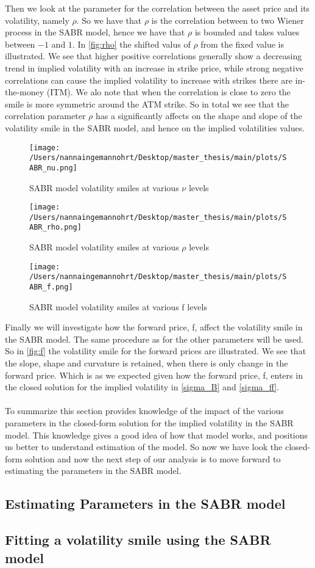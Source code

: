 Then we look at the parameter for the correlation between the asset price and its volatility, namely $\rho$.
So we have that $\rho$ is the correlation between to two Wiener process in the SABR model, hence we have
that $\rho$ is bounded and takes values between $-1$ and $1$. In \autoref{fig:rho} the shifted valus of $\rho$
from the fixed value is illustrated. 
We see that higher positive correlations generally show a decreasing trend in implied volatility with an increase in strike price, 
while strong negative correlations can cause the implied volatility to increase with strikes there are in-the-money (ITM).
We alo note that when the correlation is close to zero the smile is more symmetric around the ATM strike. 
So in total we see that the correlation parameter $\rho$ has a significantly affects on the shape and slope of
the volatility smile in the SABR model, and hence on the implied volatilities values.
\begin{figure}[H]
    \centering
    \texttt{[image: /Users/nannaingemannohrt/Desktop/master\_thesis/main/plots/SABR\_nu.png]}
    \caption{SABR model volatility smiles at various $\nu$ levels}
    \label{fig:nu}
\end{figure}

\begin{figure}[H]
    \centering
    \texttt{[image: /Users/nannaingemannohrt/Desktop/master\_thesis/main/plots/SABR\_rho.png]}
    \caption{SABR model volatility smiles at various $\rho$ levels}
    \label{fig:rho}
\end{figure}

\begin{figure}[H]
    \centering
    \texttt{[image: /Users/nannaingemannohrt/Desktop/master\_thesis/main/plots/SABR\_f.png]}
    \caption{SABR model volatility smiles at various f levels}
    \label{fig:f}
\end{figure}
\noindent
Finally we will investigate how the forward price, f, affect the volatility smile in the SABR model. 
The same procedure as for the other parameters will be used. So in \autoref{fig:f} the volatility smile
for the forward prices are illustrated. We see that the slope, shape and curvature is retained, when there
is only change in the forward price. Which is as we expected given how the forward price, f, enters in the closed
solution for the implied volatility in \autoref{sigma_B} and \autoref{sigma_ff}.
\\\\
To summarize this section provides knowledge of the impact of the various parameters in the closed-form solution
for the implied volatility in the SABR model. This knowledge gives a good idea of how that model works, and 
positions us better to understand estimation of the model. So now we have look the closed-form solution and 
now the next step of our analysis is to move forward to estimating the parameters in the SABR model.
\newpage
\subsection{Estimating Parameters in the SABR model}
\subsection{Fitting a volatility smile using the SABR model}
